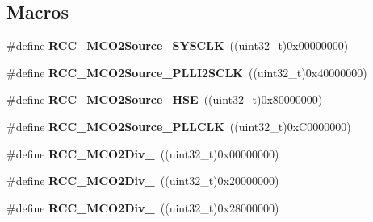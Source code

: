 \subsection*{Macros}
\begin{DoxyCompactItemize}
\item 
\mbox{\label{group___r_c_c___m_c_o2___clock___source___prescaler_ga802ff9ee9df708eb5d463b4e0e9ac19e}} 
\#define {\bfseries R\+C\+C\+\_\+\+M\+C\+O2\+Source\+\_\+\+S\+Y\+S\+C\+LK}~((uint32\+\_\+t)0x00000000)
\item 
\mbox{\label{group___r_c_c___m_c_o2___clock___source___prescaler_ga87f48662c00014691bc33a8e22a1c986}} 
\#define {\bfseries R\+C\+C\+\_\+\+M\+C\+O2\+Source\+\_\+\+P\+L\+L\+I2\+S\+C\+LK}~((uint32\+\_\+t)0x40000000)
\item 
\mbox{\label{group___r_c_c___m_c_o2___clock___source___prescaler_ga3c43be977d9704ca3cfd0905ea0c1f90}} 
\#define {\bfseries R\+C\+C\+\_\+\+M\+C\+O2\+Source\+\_\+\+H\+SE}~((uint32\+\_\+t)0x80000000)
\item 
\mbox{\label{group___r_c_c___m_c_o2___clock___source___prescaler_ga62bdca25e6355e6d18d7b6eb709eab7d}} 
\#define {\bfseries R\+C\+C\+\_\+\+M\+C\+O2\+Source\+\_\+\+P\+L\+L\+C\+LK}~((uint32\+\_\+t)0x\+C0000000)
\item 
\mbox{\label{group___r_c_c___m_c_o2___clock___source___prescaler_gad2778bc4aebec26810f8059058152557}} 
\#define {\bfseries R\+C\+C\+\_\+\+M\+C\+O2\+Div\+\_}~((uint32\+\_\+t)0x00000000)
\item 
\mbox{\label{group___r_c_c___m_c_o2___clock___source___prescaler_gac64afcfec90f2783fd78887e8a783ecb}} 
\#define {\bfseries R\+C\+C\+\_\+\+M\+C\+O2\+Div\+\_}~((uint32\+\_\+t)0x20000000)
\item 
\mbox{\label{group___r_c_c___m_c_o2___clock___source___prescaler_gad94c96c38025e6a5164bc277d87173a6}} 
\#define {\bfseries R\+C\+C\+\_\+\+M\+C\+O2\+Div\+\_}~((uint32\+\_\+t)0x28000000)

\end{DoxyCompactItemize}
